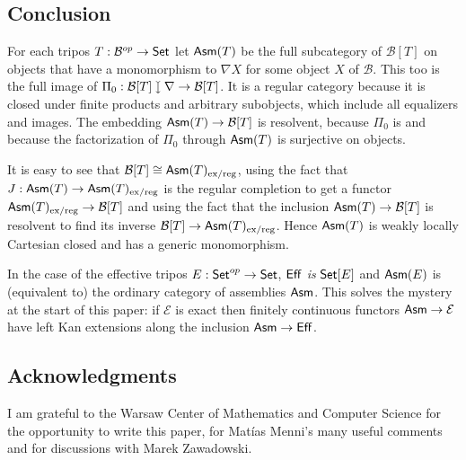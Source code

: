 \documentclass[sort&compress]{elsarticle}
\theoremstyle{plain}
\theoremstyle{definition}
\theoremstyle{remark}
\newcommand\hide[1]{}
\newcommand\cat\mathcal
\newcommand{\downmono}{\mathbin{\rotatebox[origin=c]{-90}{$\rightarrowtail$}}}
\begin{document}
\subsection{Conclusion} 
For each tripos $T:\cat B\dual \to \Set$ let $\mathsf{Asm}(T)$ be the full subcategory of $\cat B[T]$ on objects that have a monomorphism to $\nabla X$ for some object $X$ of $\cat B$. This too is the full image of $\Pi_0:\cat B[T]\downmono \nabla \to \cat B[T]$. It is a regular category because it is closed under finite products and arbitrary subobjects, which include all equalizers and images. The embedding $\Asm(T) \to \cat B[T]$ is resolvent, because $\Pi_0$ is and because the factorization of $\Pi_0$ through $\mathsf{Asm}(T)$ is surjective on objects.

It is easy to see that $\cat B[T] \cong \Asm(T)\exreg$, using the fact that $J:\mathsf{Asm}(T) \to \mathsf{Asm}(T)_\mathrm{ex/reg}$ is the regular completion to get a functor $\Asm(T)\exreg \to \cat B[T]$ and using the fact that the inclusion $\Asm(T)\to \cat B[T]$ is resolvent to find its inverse $\cat B[T] \to \Asm(T)\exreg$.
Hence $\mathsf{Asm}(T)$ is weakly locally Cartesian closed and has a generic monomorphism.

In the case of the effective tripos $E:\mathsf{Set}^{op} \to \mathsf{Set}$, $\mathsf{Eff}$ \emph{is} $\mathsf{Set}[E]$ and $\mathsf{Asm}(E)$ is (equivalent to) the ordinary category of assemblies $\mathsf{Asm}$. This solves the mystery at the start of this paper: if $\cat E$ is exact then finitely continuous functors $\Asm \to\cat E$ have left Kan extensions along the inclusion $\mathsf{Asm}\to \mathsf{Eff}$.


\hide{ Analyse: morfismes van tripossen. Probleem: $\Tot(T)$ is niet finitely complete. Misschien iets voor een ander artikel dus. }

\subsection*{Acknowledgments} 
I am grateful to the Warsaw Center of Mathematics and Computer Science for the opportunity to write this paper, for Mat\'ias Menni's many useful comments and for discussions with Marek Zawadowski.



{}
\end{document}
